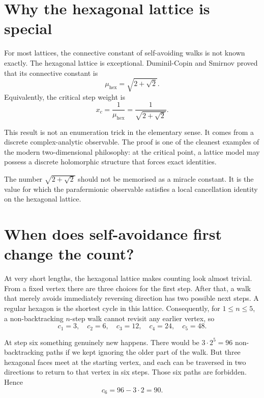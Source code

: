 
\section{Why the hexagonal lattice is special}

For most lattices, the connective constant of self-avoiding walks is not known exactly.  The hexagonal lattice is exceptional.  Duminil-Copin and Smirnov proved that its connective constant is
\[
  \mu_{\mathrm{hex}}=\sqrt{2+\sqrt2}.
\]
Equivalently, the critical step weight is
\[
  x_c=\frac1{\mu_{\mathrm{hex}}}=\frac1{\sqrt{2+\sqrt2}}.
\]

This result is not an enumeration trick in the elementary sense.  It comes from a discrete complex-analytic observable.  The proof is one of the cleanest examples of the modern two-dimensional philosophy: at the critical point, a lattice model may possess a discrete holomorphic structure that forces exact identities.

\begin{remark}
The number \(\sqrt{2+\sqrt2}\) should not be memorised as a miracle constant.  It is the value for which the parafermionic observable satisfies a local cancellation identity on the hexagonal lattice.
\end{remark}

\section{When does self-avoidance first change the count?}


At very short lengths, the hexagonal lattice makes counting look almost trivial. From a fixed vertex there are three choices for the first step. After that, a walk that merely avoids immediately reversing direction has two possible next steps. A regular hexagon is the shortest cycle in this lattice. Consequently, for $1\le n\le5$, a non-backtracking $n$-step walk cannot revisit any earlier vertex, so
\[
 \boxed{c_1=3,\quad c_2=6,\quad c_3=12,\quad
        c_4=24,\quad c_5=48.}
\]

At step six something genuinely new happens. There would be $3\cdot2^5=96$ non-backtracking paths if we kept ignoring the older part of the walk. But three hexagonal faces meet at the starting vertex, and each can be traversed in two directions to return to that vertex in six steps. Those six paths are forbidden. Hence
\[
 \boxed{c_6=96-3\cdot2=90.}
\]

